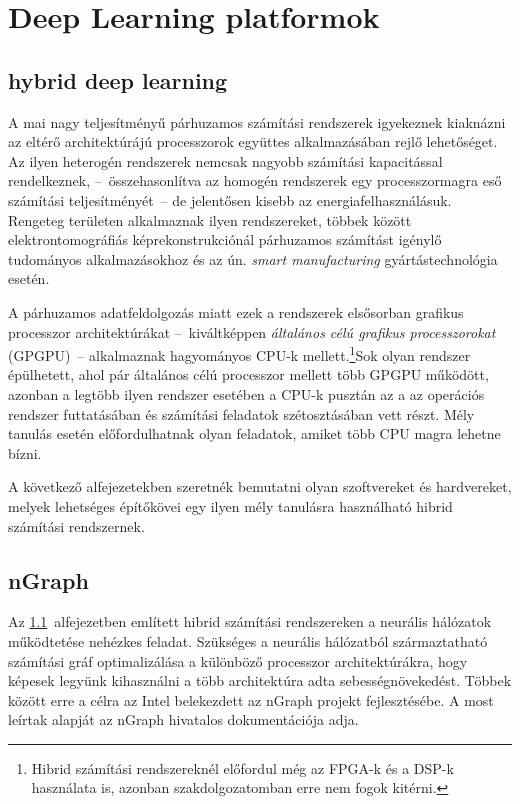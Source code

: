 \chapter{Deep Learning platformok}
\section{hybrid deep learning} \label{sect:hybridDL}
A mai nagy teljesítményű párhuzamos számítási rendszerek igyekeznek kiaknázni az eltérő architektúrájú processzorok együttes alkalmazásában rejlő lehetőséget. Az ilyen heterogén rendszerek nemcsak nagyobb számítási kapacitással rendelkeznek, --~összehasonlítva az homogén rendszerek egy processzormagra eső számítási teljesítményét~-- de jelentősen kisebb az energiafelhasználásuk. Rengeteg területen alkalmaznak ilyen rendszereket, többek között elektrontomográfiás képrekonstrukciónál\cite{agulleiro2012} párhuzamos számítást igénylő tudományos alkalmazásokhoz\cite{meredith2011} és az ún. \emph{smart manufacturing} gyártástechnológia esetén.\cite{li2019}

A párhuzamos adatfeldolgozás miatt ezek a rendszerek elsősorban grafikus processzor architektúrákat --~kiváltképpen \emph{általános célú grafikus processzorokat} (GPGPU)~-- alkalmaznak hagyományos CPU-k mellett.\footnote{Hibrid számítási rendszereknél előfordul még az FPGA-k és a DSP-k használata is, azonban szakdolgozatomban erre nem fogok kitérni.}Sok olyan rendszer épülhetett, ahol pár általános célú processzor mellett több GPGPU működött, azonban a legtöbb ilyen rendszer esetében a CPU-k pusztán az a az operációs rendszer futtatásában és számítási feladatok szétosztásában vett részt. Mély tanulás esetén előfordulhatnak olyan feladatok, amiket több CPU magra lehetne bízni.

A következő alfejezetekben szeretnék bemutatni olyan szoftvereket és hardvereket, melyek lehetséges építőkövei egy ilyen mély tanulásra használható hibrid számítási rendszernek.

\section{nGraph}
Az \ref{sect:hybridDL}~alfejezetben említett hibrid számítási rendszereken a neurális hálózatok működtetése nehézkes feladat. Szükséges a neurális hálózatból származtatható számítási gráf optimalizálása a különböző processzor architektúrákra, hogy képesek legyünk kihasználni a több architektúra adta sebességnövekedést. Többek között erre a célra az Intel belekezdett az nGraph projekt fejlesztésébe. A most leírtak alapját az nGraph hivatalos dokumentációja adja\cite{web:ngraph_intro}.

